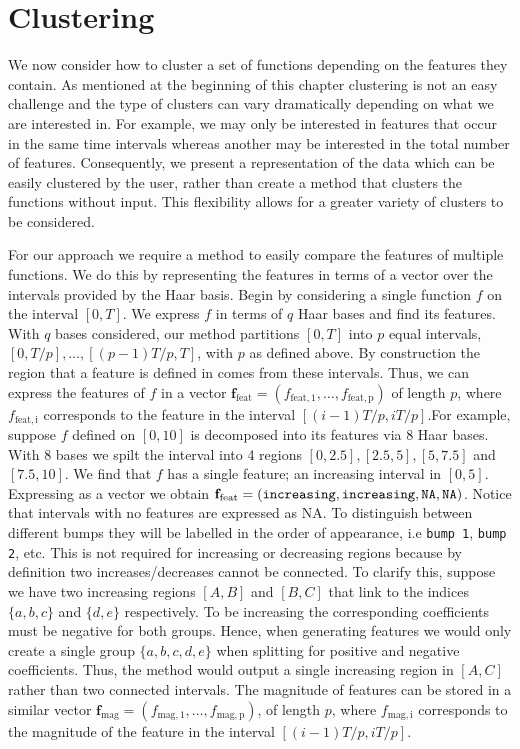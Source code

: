 \documentclass[12pt]{book} %
\begin{document}
\section{Clustering} 
We now consider how to cluster a set of functions depending on the features they contain. As mentioned at the beginning of this chapter clustering is not an easy challenge and the type of clusters can vary dramatically depending on what we are interested in. For example, we may only be interested in features that occur in the same time intervals whereas another may be interested in the total number of features. Consequently, we present a representation of the data which can be easily clustered by the user, rather than create a method that clusters the functions without input. This flexibility allows for a greater variety of clusters to be considered. 



For our approach we require a method to easily compare the features of multiple functions. We do this by representing the features in terms of a vector over the intervals provided by the Haar basis. Begin by considering a single function $f$ on the interval $[0,T]$. We express $f$ in terms of $q$ Haar bases and find its features. With $q$ bases considered, our method partitions $[0,T]$ into $p$ equal intervals, $[0,T/p], \dots, [(p-1)T/p, T]$, with $p$ as defined above. By construction the region that a feature is defined in comes from these intervals. Thus, we can express the features of $f$ in a vector $\mathbf{f}_{\mathrm{feat}} = (f_{\mathrm{feat,1}} , \dots, f_{\mathrm{feat,p}})$ of length $p$, where $f_{\mathrm{feat,i}}$ corresponds to the feature in the interval $[(i-1)T/p,iT/p]$.For example, suppose $f$ defined on $[0,10]$ is decomposed into its features via 8 Haar bases. With 8 bases we spilt the interval into 4 regions $[0,2.5], [2.5,5], [5,7.5]$ and $[7.5,10]$. We find that $f$ has a single feature; an increasing interval in $[0,5]$. Expressing as a vector we obtain $\mathbf{f}_{\mathrm{feat}} = (\tt{increasing},\tt{increasing},\tt{NA} ,\tt{NA})$. Notice that intervals with no features are expressed as NA. To distinguish between different bumps they will be labelled in the order of appearance, i.e {\tt bump 1}, {\tt bump 2}, etc. This is not required for increasing or decreasing regions because by definition two increases/decreases cannot be connected. To clarify this, suppose we have two increasing regions $[A,B]$ and $[B,C]$ that link to the indices $\{a,b,c\}$ and $\{d,e\}$ respectively. To be increasing the corresponding coefficients must be negative for both groups. Hence, when generating features we would only create a single group $\{a,b,c,d,e\}$ when splitting for positive and negative coefficients. Thus, the method would output a single increasing region in $[A,C]$ rather than two connected intervals. The magnitude of features can be stored in a similar vector $\mathbf{f}_{\mathrm{mag}}= (f_{\mathrm{mag,1}} , \dots, f_{\mathrm{mag,p}})$, of length $p$, where $f_{\mathrm{mag,i}}$ corresponds to the magnitude of the feature in the interval $[(i-1)T/p,iT/p]$.
\end{document}
